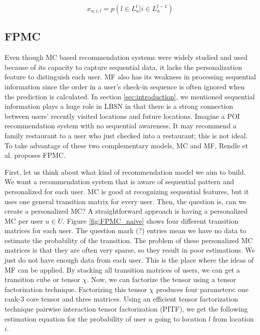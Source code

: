\documentclass{sig-alternate}
\begin{document}
\begin{equation}
	x_{u,i,l}=p(l \in L_u^t | i \in L_u^{t-1})
\label{eq:goal}
\end{equation}

\subsection{FPMC}
\label{sec:typeChangesSpecialChars}

Even though MC based recommendation systems were widely studied and used because of 
its capacity to capture sequential data, it lacks the personalization feature to distinguish each user. 
MF also has its weakness in processing sequential information since the order in a user's check-in sequence 
is often ignored when the prediction is calculated.
In section \ref{sec:introduction}, we mentioned sequential information plays a huge role in LBSN 
in that there is a strong connection between users' recently visited locations and future locations. 
Imagine a POI recommendation system with no sequential awareness. 
It may recommend a family restaurant to a user who just checked into a restaurant; this is not ideal. 
To take advantage of these two complementary models, MC and MF, Rendle et al. \cite{Rendle:2010:FPM} proposes FPMC.

First, let us think about what kind of recommendation model we aim to build. 
We want a recommendation system that is aware of sequential pattern and personalized for each user.
MC is good at recognizing sequential features, but it uses one general transition matrix for every user. 
Then, the question is, can we create a personalized MC?
A straightforward approach is having a personalized MC per user $u \in U$. 
Figure \ref{fig:FPMC_naive} shows four different transition matrices for each user. 
The question mark (?) entries mean we have no data to estimate the probability of the transition. The problem of these personalized 
MC matrices is that they are often very sparse, so they result in poor estimations. We just do not have enough data from
each user. This is the place where the ideas of MF can be applied. By stacking all transition matrices of users, 
we can get a transition cube or tensor $\chi$. Now, we can factorize the tensor using a tensor factorization technique. 
Factorizing this tensor $\chi$ produces four parameters: one rank-3 core tensor and three matrices. Using an efficient tensor 
factorization technique pairwise interaction tensor factorization (PITF), we get the following 
estimation equation for the probability of user $u$ going to location $l$ from location $i$. \cite{Rendle:2010:PIT}
\end{document}
